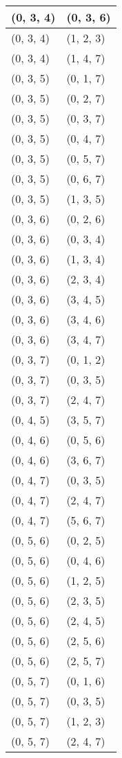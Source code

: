 \begin{footnotesize}
\begin{longtable}[c]{|l|l|}
(0, 3, 4)
&(0, 3, 6)
\\ \hline
(0, 3, 4)
&(1, 2, 3)
\\ \hline
(0, 3, 4)
&(1, 4, 7)
\\ \hline
(0, 3, 5)
&(0, 1, 7)
\\ \hline
(0, 3, 5)
&(0, 2, 7)
\\ \hline
(0, 3, 5)
&(0, 3, 7)
\\ \hline
(0, 3, 5)
&(0, 4, 7)
\\ \hline
(0, 3, 5)
&(0, 5, 7)
\\ \hline
(0, 3, 5)
&(0, 6, 7)
\\ \hline
(0, 3, 5)
&(1, 3, 5)
\\ \hline
(0, 3, 6)
&(0, 2, 6)
\\ \hline
(0, 3, 6)
&(0, 3, 4)
\\ \hline
(0, 3, 6)
&(1, 3, 4)
\\ \hline
(0, 3, 6)
&(2, 3, 4)
\\ \hline
(0, 3, 6)
&(3, 4, 5)
\\ \hline
(0, 3, 6)
&(3, 4, 6)
\\ \hline
(0, 3, 6)
&(3, 4, 7)
\\ \hline
(0, 3, 7)
&(0, 1, 2)
\\ \hline
(0, 3, 7)
&(0, 3, 5)
\\ \hline
(0, 3, 7)
&(2, 4, 7)
\\ \hline
(0, 4, 5)
&(3, 5, 7)
\\ \hline
(0, 4, 6)
&(0, 5, 6)
\\ \hline
(0, 4, 6)
&(3, 6, 7)
\\ \hline
(0, 4, 7)
&(0, 3, 5)
\\ \hline
(0, 4, 7)
&(2, 4, 7)
\\ \hline
(0, 4, 7)
&(5, 6, 7)
\\ \hline
(0, 5, 6)
&(0, 2, 5)
\\ \hline
(0, 5, 6)
&(0, 4, 6)
\\ \hline
(0, 5, 6)
&(1, 2, 5)
\\ \hline
(0, 5, 6)
&(2, 3, 5)
\\ \hline
(0, 5, 6)
&(2, 4, 5)
\\ \hline
(0, 5, 6)
&(2, 5, 6)
\\ \hline
(0, 5, 6)
&(2, 5, 7)
\\ \hline
(0, 5, 7)
&(0, 1, 6)
\\ \hline
(0, 5, 7)
&(0, 3, 5)
\\ \hline
(0, 5, 7)
&(1, 2, 3)
\\ \hline
(0, 5, 7)
&(2, 4, 7)
\\ \hline

\end{longtable}
\end{footnotesize}

